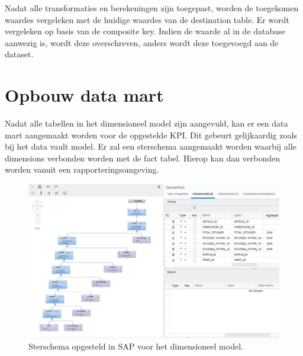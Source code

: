 Nadat alle transformaties en berekeningen zijn toegepast, worden de toegekomen waardes vergeleken met de huidige waardes van de destination table. Er wordt vergeleken op basis van de composite key. Indien de waarde al in de database aanwezig is, wordt deze overschreven, anders wordt deze toegevoegd aan de dataset.

\section{Opbouw data mart}
Nadat alle tabellen in het dimensioneel model zijn aangevuld, kan er een data mart aangemaakt worden voor de opgestelde KPI. Dit gebeurt gelijkaardig zoals bij het data vault model. Er zal een sterschema aangemaakt worden waarbij alle dimensions verbonden worden met de fact tabel. Hierop kan dan verbonden worden vanuit een rapporteringsomgeving. 

\begin{figure}[h]
	\centering
	\includegraphics[scale=0.5]{../images/DM_FG_datamart.png}
	\caption{Sterschema opgesteld in SAP voor het dimensioneel model.}
	\label{fig:dmdmart}
\end{figure}
